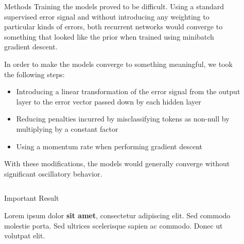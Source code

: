 \documentclass[final]{beamer}
\newlength{\sepwid}
\newlength{\onecolwid}
\newlength{\twocolwid}
\begin{document}
\begin{frame}[t]
\begin{columns}[t]
\begin{column}{\twocolwid}
\begin{column}{\twocolwid}
\begin{block}{Methods}
Training the models proved to be difficult. Using a standard supervised error signal and without introducing any weighting to particular kinds of errors, both recurrent networks would converge to something that looked like the prior when trained using minibatch gradient descent.

In order to make the models converge to something meaningful, we took the following steps:
\begin{itemize}
\item Introducing a linear transformation of the error signal from the output layer to the error vector passed down by each hidden layer
\item Reducing penalties incurred by misclassifying tokens as non-null by multiplying by a constant factor
\item Using a momentum rate when performing gradient descent
\end{itemize}
With these modifications, the models would generally converge without significant oscillatory behavior.
\end{block}



\end{column} %


\begin{alertblock}{Important Result}

Lorem ipsum dolor \textbf{sit amet}, consectetur adipiscing elit. Sed commodo molestie porta. Sed ultrices scelerisque sapien ac commodo. Donec ut volutpat elit.

\end{alertblock} 

\end{column} %

\begin{column}{\sepwid}\end{column} %

\begin{column}{\onecolwid} %



\end{column}
\end{columns}
\end{frame}
\end{document}

